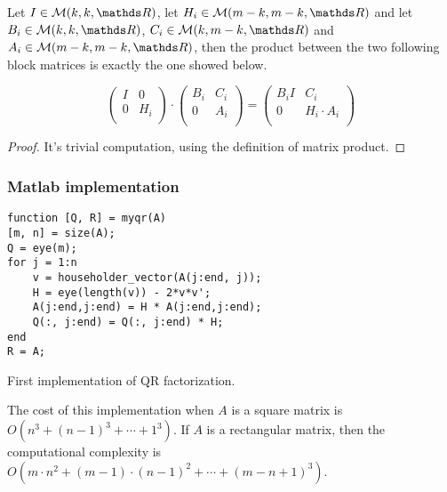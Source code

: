 \documentclass[computational_mathematics.tex]{subfiles}
\begin{document}
\begin{theorem}
  Let $I \in \mathcal{M}(k, k, \R)$, let $H_{i} \in \mathcal{M}(m-k, m-k, \R)$ and let $B_{i} \in \mathcal{M}(k, k, \R)$, $C_{i} \in \mathcal{M}(k, m-k, \R)$ and $A_{i} \in \mathcal{M}(m-k, m-k, \R)$, then the product between the two following block matrices is exactly the one showed below.

\[\begin{pmatrix}
    I & 0\\
    0 & H_{i}\\
  \end{pmatrix}
  \cdot 
  \begin{pmatrix}
    B_{i} & C_{i}\\
    0 & A_{i}\\
  \end{pmatrix}
  = 
  \begin{pmatrix}
    B_{i}I & C_{i}\\
    0 & H_{i} \cdot A_{i}\\
  \end{pmatrix}
\]
\end{theorem}

\begin{proof}
  It's trivial computation, using the definition of matrix product.
\end{proof}

\subsubsection{Matlab implementation}

\begin{center}
\begin{minipage}{.9\linewidth}
\begin{algorithm}[H]
\begin{verbatim}
function [Q, R] = myqr(A)
[m, n] = size(A);
Q = eye(m);
for j = 1:n
    v = householder_vector(A(j:end, j));
    H = eye(length(v)) - 2*v*v';
    A(j:end,j:end) = H * A(j:end,j:end);
    Q(:, j:end) = Q(:, j:end) * H;
end
R = A;
\end{verbatim}
  \label{alg:26ottQR1}
\caption{First implementation of QR factorization.}
\end{algorithm}
\end{minipage}
\end{center}

\begin{proposition}
  The cost of this implementation when $A$ is a square matrix is $O(n^{3} + {(n-1)}^{3} + \cdots + 1^{3})$. If $A$ is a rectangular matrix, then the computational complexity is $O(m \cdot n^{2} + {(m-1) \cdot (n-1)}^{2} + \cdots + {(m - n + 1)}^{3})$.
\end{proposition}
\end{document}
